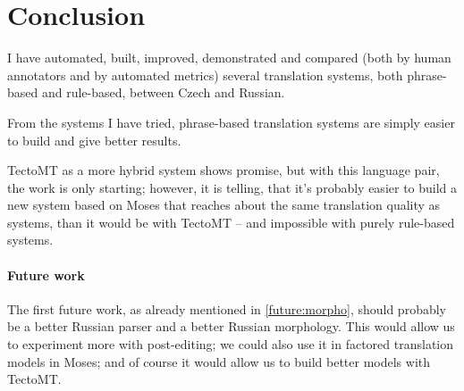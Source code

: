 \chapter*{Conclusion}

I have automated, built, improved, demonstrated and compared (both by human annotators and by automated metrics) several translation systems, both phrase-based and rule-based, between Czech and Russian.

From the systems I have tried, phrase-based translation systems are simply easier to build and give better results.

TectoMT as a more hybrid system shows promise, but with this language pair, the work is only starting; however, it is telling, that it's probably easier to build a new system based on Moses that reaches about the same translation quality as  systems, than it would be with TectoMT -- and impossible with purely rule-based systems.


\subsubsection{Future work}
The first future work, as already mentioned in \ref{future:morpho}, should probably be a better Russian parser and a better Russian morphology. This would allow us to experiment more with post-editing; we could also use it in factored translation models in Moses; and of course it would allow us to build better models with TectoMT.

